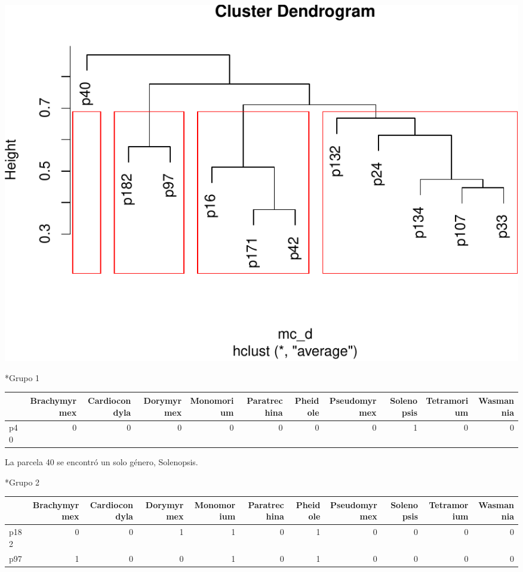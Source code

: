\documentclass[11pt,]{article}
\newenvironment{Shaded}{\begin{snugshade}}{\end{snugshade}}
\newcommand{\KeywordTok}[1]{\textcolor[rgb]{0.13,0.29,0.53}{\textbf{#1}}}
\newcommand{\StringTok}[1]{\textcolor[rgb]{0.31,0.60,0.02}{#1}}
\newcommand{\OperatorTok}[1]{\textcolor[rgb]{0.81,0.36,0.00}{\textbf{#1}}}
\newcommand{\NormalTok}[1]{#1}
\begin{document}
\includegraphics{manuscrito_files/figure-latex/dendro_emdilone-1.pdf}

*Grupo 1

\begin{Shaded}
\end{Shaded}

\begin{longtable}[]{@{}lrrrrrrrrrr@{}}
\toprule
& Brachymyrmex & Cardiocondyla & Dorymyrmex & Monomorium & Paratrechina
& Pheidole & Pseudomyrmex & Solenopsis & Tetramorium &
Wasmannia\tabularnewline
\midrule
\endhead
p40 & 0 & 0 & 0 & 0 & 0 & 0 & 0 & 1 & 0 & 0\tabularnewline
\bottomrule
\end{longtable}

La parcela 40 se encontró un solo género, Solenopsis.

*Grupo 2

\begin{Shaded}
\end{Shaded}

\begin{longtable}[]{@{}lrrrrrrrrrr@{}}
\toprule
& Brachymyrmex & Cardiocondyla & Dorymyrmex & Monomorium & Paratrechina
& Pheidole & Pseudomyrmex & Solenopsis & Tetramorium &
Wasmannia\tabularnewline
\midrule
\endhead
p182 & 0 & 0 & 1 & 1 & 0 & 1 & 0 & 0 & 0 & 0\tabularnewline
p97 & 1 & 0 & 0 & 1 & 0 & 1 & 0 & 0 & 0 & 0\tabularnewline
\bottomrule
\end{longtable}
\end{document}
